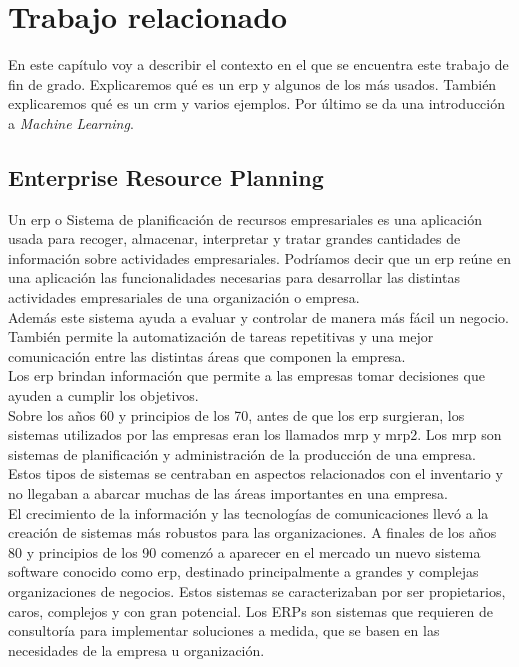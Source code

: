 \chapter{Trabajo relacionado}

En este capítulo voy a describir el contexto en el que se encuentra este trabajo de fin de grado. Explicaremos qué es un \acrshort{erp} y algunos de los más usados. También explicaremos qué es un \acrshort{crm} y varios ejemplos. Por último se da una introducción a \textit{Machine Learning}. 


\section[Enterprise Resource Planning]{Enterprise Resource Planning}

Un \acrfull{erp} o Sistema de planificación de recursos empresariales es una aplicación usada para recoger, almacenar,
interpretar y tratar grandes cantidades de información sobre actividades empresariales.
Podríamos decir que un \acrshort{erp} reúne en una aplicación las funcionalidades necesarias para desarrollar las distintas actividades empresariales de una organización o empresa.\\

Además este sistema ayuda a evaluar y controlar de manera más fácil un negocio. También permite la automatización de tareas repetitivas y una mejor comunicación entre las distintas áreas que componen la empresa.\\

Los \acrshort{erp} brindan información que permite a las empresas tomar decisiones que ayuden a cumplir los objetivos.\\

Sobre los años 60 y principios de los 70, antes de que los \acrshort{erp} surgieran, los sistemas utilizados por las empresas eran los llamados \acrshort{mrp} y \acrshort{mrp2}.
Los \acrfull{mrp} son sistemas de planificación y administración de la producción de una empresa. Estos tipos de sistemas se centraban en aspectos relacionados con el inventario y no llegaban a abarcar muchas de las áreas importantes en una empresa.\\



El crecimiento de la información y las tecnologías de comunicaciones llevó a la creación de sistemas más robustos para 
las organizaciones. A finales de los años 80 y principios de los 90 comenzó a aparecer en el mercado un nuevo sistema 
software conocido como \acrshort{erp}, destinado principalmente a grandes y complejas organizaciones de negocios. Estos sistemas 
se caracterizaban por ser propietarios, caros, complejos y con gran potencial.
Los ERPs son sistemas que requieren de consultoría para implementar soluciones a medida, que se basen en las necesidades de la empresa u organización.\\

